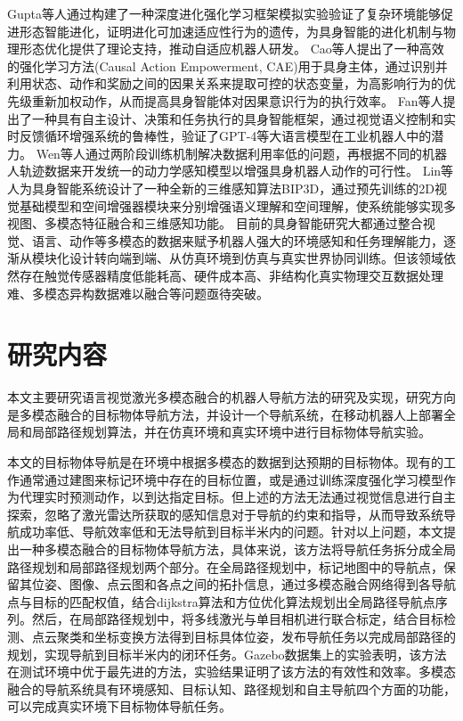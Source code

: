 	Gupta\cite{gupta2021embodied}等人通过构建了一种深度进化强化学习框架模拟实验验证了复杂环境能够促进形态智能进化，证明进化可加速适应性行为的遗传，为具身智能的进化机制与物理形态优化提供了理论支持，推动自适应机器人研发。
	Cao\cite{cao2025causal}等人提出了一种高效的强化学习方法(Causal Action Empowerment, CAE)用于具身主体，通过识别并利用状态、动作和奖励之间的因果关系来提取可控的状态变量，为高影响行为的优先级重新加权动作，从而提高具身智能体对因果意识行为的执行效率。
    Fan\cite{fan2025embodied}等人提出了一种具有自主设计、决策和任务执行的具身智能框架，通过视觉语义控制和实时反馈循环增强系统的鲁棒性，验证了GPT-4等大语言模型在工业机器人中的潜力。
	Wen\cite{wen2024vidman}等人通过两阶段训练机制解决数据利用率低的问题，再根据不同的机器人轨迹数据来开发统一的动力学感知模型以增强具身机器人动作的可行性。
	Lin\cite{lin2024bip3d}等人为具身智能系统设计了一种全新的三维感知算法BIP3D，通过预先训练的2D视觉基础模型和空间增强器模块来分别增强语义理解和空间理解，使系统能够实现多视图、多模态特征融合和三维感知功能。
	目前的具身智能研究大都通过整合视觉、语言、动作等多模态的数据来赋予机器人强大的环境感知和任务理解能力，逐渐从模块化设计转向端到端、从仿真环境到仿真与真实世界协同训练。但该领域依然存在触觉传感器精度低能耗高、硬件成本高、非结构化真实物理交互数据处理难、多模态异构数据难以融合等问题亟待突破。

\section{研究内容}

	本文主要研究语言视觉激光多模态融合的机器人导航方法的研究及实现，研究方向是多模态融合的目标物体导航方法，并设计一个导航系统，在移动机器人上部署全局和局部路径规划算法，并在仿真环境和真实环境中进行目标物体导航实验。
	
	本文的目标物体导航是在环境中根据多模态的数据到达预期的目标物体。现有的工作通常通过建图来标记环境中存在的目标位置，或是通过训练深度强化学习模型作为代理实时预测动作，以到达指定目标。但上述的方法无法通过视觉信息进行自主探索，忽略了激光雷达所获取的感知信息对于导航的约束和指导，从而导致系统导航成功率低、导航效率低和无法导航到目标半米内的问题。针对以上问题，本文提出一种多模态融合的目标物体导航方法，具体来说，该方法将导航任务拆分成全局路径规划和局部路径规划两个部分。在全局路径规划中，标记地图中的导航点，保留其位姿、图像、点云图和各点之间的拓扑信息，通过多模态融合网络得到各导航点与目标的匹配权值，结合dijkstra算法和方位优化算法规划出全局路径导航点序列。然后，在局部路径规划中，将多线激光与单目相机进行联合标定，结合目标检测、点云聚类和坐标变换方法得到目标具体位姿，发布导航任务以完成局部路径的规划，实现导航到目标半米内的闭环任务。Gazebo数据集上的实验表明，该方法在测试环境中优于最先进的方法，实验结果证明了该方法的有效性和效率。多模态融合的导航系统具有环境感知、目标认知、路径规划和自主导航四个方面的功能，可以完成真实环境下目标物体导航任务。

